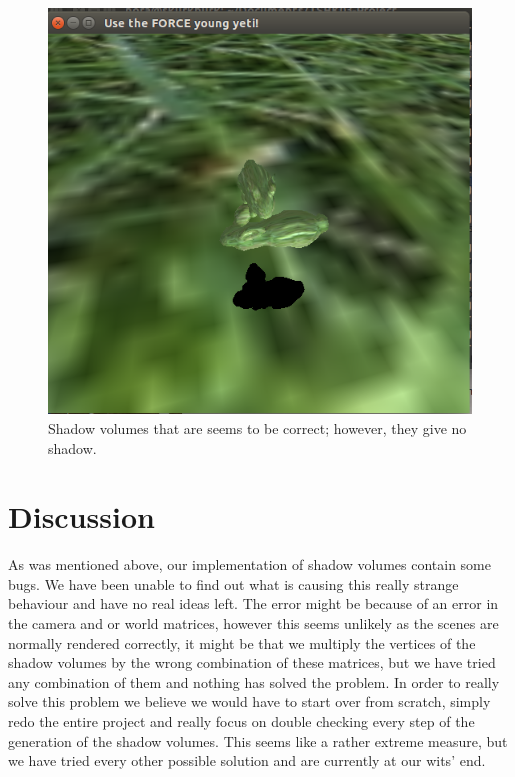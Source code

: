 \documentclass[a4paper, 12pt]{article}
\begin{document}
\begin{figure}[h]
\centering
\includegraphics[width=\textwidth]{skuggvolymer.png}
\caption{Shadow volumes that are seems to be correct; however, they give no shadow. }
\label{fig:shadow}
\end{figure}

 
\section{Discussion}
As was mentioned above, our implementation of shadow volumes contain some bugs. We have been unable to find out what is causing this really strange behaviour and have no real ideas left. The error might be because of an error in the camera and or world matrices, however this seems unlikely as the scenes are normally rendered correctly, it might be that we multiply the vertices of the shadow volumes by the wrong combination of these matrices, but we have tried any combination of them and nothing has solved the problem. In order to really solve this problem we believe we would have to start over from scratch, simply redo the entire project and really focus on double checking every step of the generation of the shadow volumes. This seems like a rather extreme measure, but
we have tried every other possible solution and are currently at our wits' end.
\end{document}
